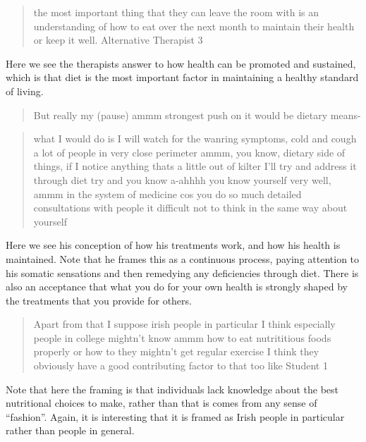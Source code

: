 \begin{quotation}
 the most important thing that they can leave the room with is an understanding of how to eat over the next month to maintain their health or keep it well.    
Alternative Therapist 3
 \end{quotation}

Here we see the therapists answer to how health can be promoted and sustained, which is that diet is the most important factor in maintaining a healthy standard of living. 

\begin{quotation}
  But really my (pause) ammm strongest push on it would be dietary means-

\end{quotation}

\begin{quotation}
  what I would do is I will watch for the wanring symptoms, cold and cough a lot of people in very close perimeter ammm, you know, dietary side of things, if I notice anything thats a little out of kilter I'll try and address it through diet try and you know a-ahhhh you know yourself very well, ammm in the system of medicine cos you do so much detailed consultations with people it difficult not to think in the same way about yourself

\end{quotation}

Here we see his conception of how his treatments work, and how his health is maintained. Note that he frames this as a continuous process, paying attention to his somatic sensations and then remedying any deficiencies through diet. There is also an acceptance that what you do for your own health is strongly shaped by the treatments that you provide for others. 

\begin{quotation}
  Apart from that I suppose irish people in particular I think especially people in college mightn't know ammm how to eat nutrititious foods properly or how to they mightn't get regular exercise I think they obviously have a good contributing factor to that too like
Student 1
\end{quotation}


Note that here the framing is that individuals lack knowledge about the best nutritional choices to make, rather than that is comes from any sense of ``fashion''. Again, it is interesting that it is framed as Irish people in particular rather than people in general. 

